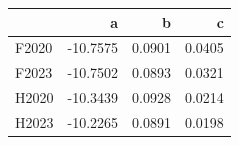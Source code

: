 \begin{tabular}{lrrr}
\toprule
 & a & b & c \\
\midrule
F2020 & -10.7575 & 0.0901 & 0.0405 \\
F2023 & -10.7502 & 0.0893 & 0.0321 \\
H2020 & -10.3439 & 0.0928 & 0.0214 \\
H2023 & -10.2265 & 0.0891 & 0.0198 \\
\bottomrule
\end{tabular}
